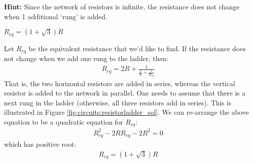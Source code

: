 \textbf{Hint:} Since the network of resistors is infinite, the resistance does not change when 1 additional ‘rung’ is added.
\begin{finalanswer}
$R_{eq}=(1+\sqrt{3})R$
\end{finalanswer}
\begin{solution}
Let $R_{eq}$ be the equivalent resistance that we'd like to find. If the resistance does not change when we add one rung to the ladder, then:
\begin{align*}
R_{eq}= 2R + \frac{1}{\frac{1}{R}+\frac{1}{R_{eq}}}
\end{align*}
That is, the two horizontal resistors are added in series, whereas the vertical resistor is added to the network in parallel. One needs to assume that there is a next rung in the ladder (otherwise, all three resistors add in series). This is illustrated in Figure \ref{fig:circuits:resistorladder_sol}.
We can re-arrange the above equation to be a quadratic equation for $R_{eq}$:
\begin{align*}
R_{eq}^2-2RR_{eq}-2R^2=0
\end{align*}
which has positive root:
\begin{align*}
R_{eq}=(1+\sqrt 3)R
\end{align*}

\end{solution}


